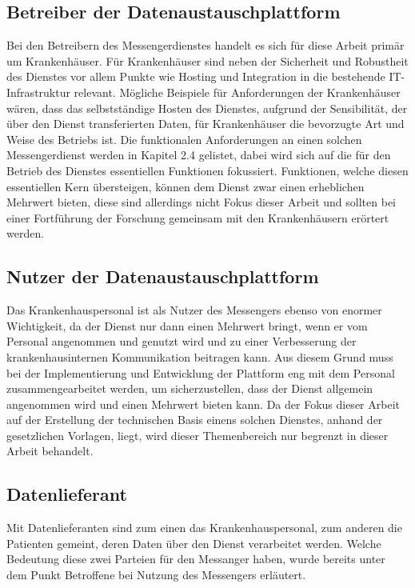 \subsection{Betreiber der Datenaustauschplattform}\label{subsection:bdd}
Bei den Betreibern des Messengerdienstes handelt es sich für diese Arbeit primär um Krankenhäuser. Für Krankenhäuser sind neben der Sicherheit und Robustheit des Dienstes vor allem Punkte wie Hosting und Integration in die bestehende IT-Infrastruktur relevant.
Mögliche Beispiele für Anforderungen der Krankenhäuser wären, dass das selbstständige Hosten des Dienstes, aufgrund der Sensibilität, der über den Dienst transferierten Daten, für Krankenhäuser die bevorzugte Art und Weise des Betriebs ist. Die funktionalen Anforderungen an einen solchen Messengerdienst werden in Kapitel 2.4 gelistet, dabei wird sich auf die für den Betrieb des Dienstes essentiellen Funktionen fokussiert. Funktionen, welche diesen essentiellen Kern übersteigen, können dem Dienst zwar einen erheblichen Mehrwert bieten, diese sind allerdings nicht Fokus dieser Arbeit und sollten bei einer Fortführung der Forschung gemeinsam mit den Krankenhäusern erörtert werden.

\subsection{Nutzer der Datenaustauschplattform}\label{subsection:ndd}
Das Krankenhauspersonal ist als Nutzer des Messengers ebenso von enormer Wichtigkeit, da der Dienst nur dann einen Mehrwert bringt, wenn er vom Personal angenommen und genutzt wird und zu einer Verbesserung der krankenhausinternen Kommunikation beitragen kann. Aus diesem Grund muss bei der Implementierung und Entwicklung der Plattform eng mit dem Personal zusammengearbeitet werden, um sicherzustellen, dass der Dienst allgemein angenommen wird und einen Mehrwert bieten kann. Da der Fokus dieser Arbeit auf der Erstellung der technischen Basis einens solchen Dienstes, anhand der gesetzlichen Vorlagen, liegt, wird dieser Themenbereich nur begrenzt in dieser Arbeit behandelt. 

\subsection{Datenlieferant}\label{subsection:hdd}
Mit Datenlieferanten sind zum einen das Krankenhauspersonal, zum anderen die Patienten gemeint, deren Daten über den Dienst verarbeitet werden. Welche Bedeutung diese zwei Parteien für den Messanger haben, wurde bereits unter dem Punkt \glqq Betroffene bei Nutzung des Messengers\grqq{} erläutert.

